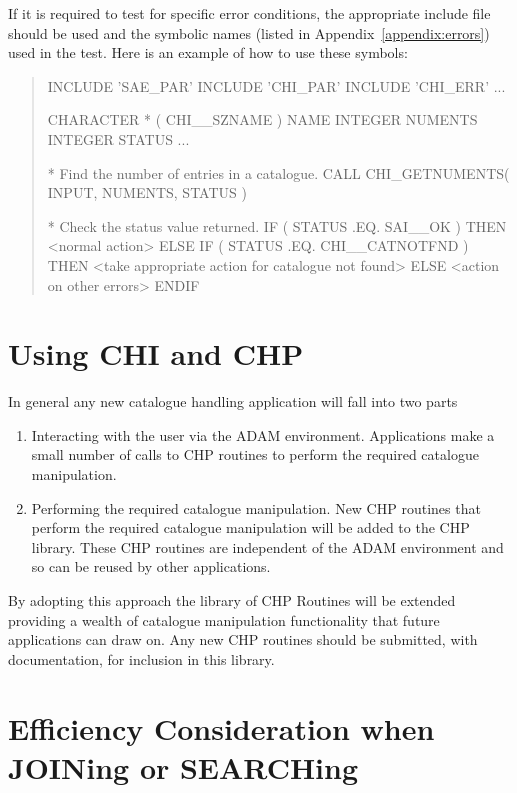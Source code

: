 \documentclass[11pt,nolof]{starlink}
\begin{document}
If it is required to test for specific error conditions, the appropriate
include file should be used and the symbolic names (listed in
Appendix~\ref{appendix:errors}) used in the test. Here is an example of how to
use these symbols:

\begin{quote}
\begin{terminalv}
      INCLUDE 'SAE_PAR'
      INCLUDE 'CHI_PAR'
      INCLUDE 'CHI_ERR'
      ...

      CHARACTER * ( CHI__SZNAME ) NAME
      INTEGER NUMENTS
      INTEGER STATUS
      ...

* Find the number of entries in a catalogue.
      CALL CHI_GETNUMENTS( INPUT, NUMENTS, STATUS )

* Check the status value returned.
      IF ( STATUS .EQ. SAI__OK ) THEN
        <normal action>
      ELSE IF ( STATUS .EQ. CHI__CATNOTFND ) THEN
        <take appropriate action for catalogue not found>
      ELSE
        <action on other errors>
      ENDIF
\end{terminalv}
\end{quote}


\section {Using CHI and CHP}

In general any new catalogue handling application will fall into two parts
\begin{enumerate}

 \item Interacting with the user via the ADAM environment. Applications make
a small number of calls to CHP routines to perform the required catalogue
manipulation.

 \item Performing the required catalogue manipulation. New CHP routines that
perform the required catalogue manipulation will be added to the CHP library.
These CHP routines are
independent of the ADAM environment
and so can be reused by other applications.

\end{enumerate}

By adopting this approach the library of CHP Routines will be extended
providing a wealth of catalogue manipulation functionality that future
applications can draw on. Any new CHP routines should be submitted, with
documentation, for inclusion in this library.

\section{Efficiency Consideration when JOINing or SEARCHing}
\end{document}
